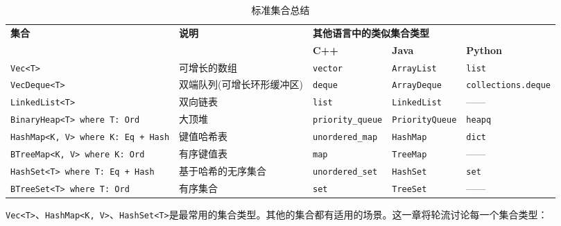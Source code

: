 \begin{table}[htb]
    \centering
    \caption{标准集合总结}
    \label{t16-1}
    \begin{tabular}{p{}p{}lll}
        \hline
        \multirow{2}{*}{\textbf{集合}}  & \multirow{2}{*}{\textbf{说明}} & \multicolumn{3}{l}{\textbf{其他语言中的类似集合类型}} \\
        \cline{3-5}
         & & \textbf{C++} & \textbf{Java} & \textbf{Python} \\
        \hline
        
        \texttt{Vec<T>} & 可增长的数组  & \texttt{vector} & \texttt{ArrayList} & \texttt{list}  \\
        \rowcolor{tablecolor}
        \texttt{VecDeque<T>} & 双端队列(可增长环形缓冲区) & \texttt{deque} & \texttt{ArrayDeque} & \texttt{collections.deque} \\
        \texttt{LinkedList<T>} & 双向链表 & \texttt{list} & \texttt{LinkedList} & —— \\
        \rowcolor{tablecolor}
        \texttt{BinaryHeap<T> where T: Ord} & 大顶堆 & \texttt{priority\_queue} & \texttt{PriorityQueue} & \texttt{heapq} \\
        \texttt{HashMap<K, V> where K: Eq + Hash} & 键值哈希表 & \texttt{unordered\_map} & \texttt{HashMap} & \texttt{dict} \\
        \rowcolor{tablecolor}
        \texttt{BTreeMap<K, V> where K: Ord} & 有序键值表 & \texttt{map} & \texttt{TreeMap} & —— \\
        \texttt{HashSet<T> where T: Eq + Hash} & 基于哈希的无序集合 & \texttt{unordered\_set} & \texttt{HashSet} & \texttt{set} \\
        \rowcolor{tablecolor}
        \texttt{BTreeSet<T> where T: Ord} & 有序集合 & \texttt{set} & \texttt{TreeSet} & —— \\
    \end{tabular}
\end{table}

\texttt{Vec<T>}、\texttt{HashMap<K, V>}、\texttt{HashSet<T>}是最常用的集合类型。其他的集合都有适用的场景。这一章将轮流讨论每一个集合类型：



